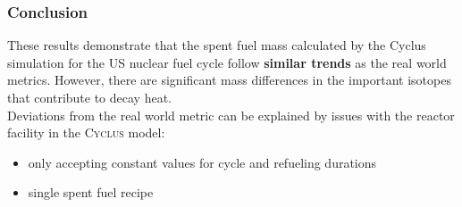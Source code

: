 \begin{frame}
  \frametitle{Conclusion}
        These results demonstrate that the spent fuel mass calculated by the Cyclus simulation for
        the US nuclear fuel cycle follow \textbf{similar trends} as the real
        world metrics.
        However, there are significant mass differences in the important isotopes that contribute to decay heat. 
        \\
        
        Deviations from the real world metric can be explained by issues with 
        the reactor facility in the \textsc{Cyclus} model: 
        \begin{itemize}
                \item only accepting constant values for
                cycle and refueling durations
                \item single spent fuel recipe 
        \end{itemize}
        
\end{frame}
